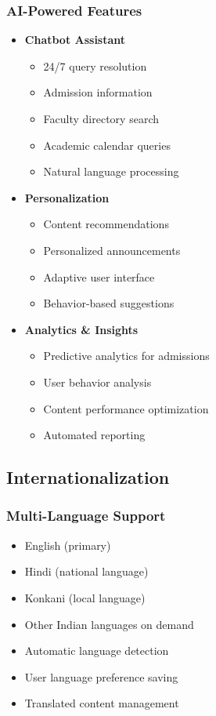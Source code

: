 \documentclass[12pt,a4paper]{report}
\begin{document}
\subsubsection*{AI-Powered Features}
\begin{itemize}
    \item \textbf{Chatbot Assistant}
    \begin{itemize}
        \item 24/7 query resolution
        \item Admission information
        \item Faculty directory search
        \item Academic calendar queries
        \item Natural language processing
    \end{itemize}
    
    \item \textbf{Personalization}
    \begin{itemize}
        \item Content recommendations
        \item Personalized announcements
        \item Adaptive user interface
        \item Behavior-based suggestions
    \end{itemize}
    
    \item \textbf{Analytics \& Insights}
    \begin{itemize}
        \item Predictive analytics for admissions
        \item User behavior analysis
        \item Content performance optimization
        \item Automated reporting
    \end{itemize}
\end{itemize}

\subsection{Internationalization}

\subsubsection*{Multi-Language Support}
\begin{itemize}
    \item English (primary)
    \item Hindi (national language)
    \item Konkani (local language)
    \item Other Indian languages on demand
    \item Automatic language detection
    \item User language preference saving
    \item Translated content management
\end{itemize}
\end{document}
